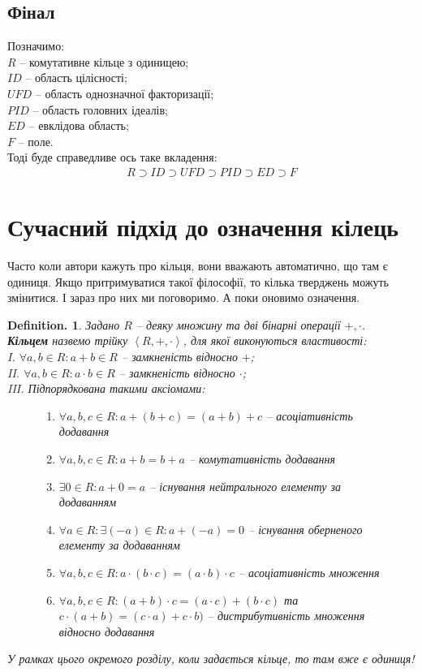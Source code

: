 \documentclass[a4paper, 10pt]{article}
\theoremstyle{theoremdd}
\theoremstyle{theoremdd}
\theoremstyle{theoremdd}
\newtheorem*{definition*}{Definition.}
\theoremstyle{theoremdd}
\theoremstyle{theoremdd}
\theoremstyle{theoremdd}
\theoremstyle{theoremdd}
\theoremstyle{theoremdd}
\theoremstyle{theoremdd}
\theoremstyle{theoremdd}
\theoremstyle{theoremdd}
\theoremstyle{theoremdd}
\theoremstyle{theoremdd}
\theoremstyle{theoremdd}
\theoremstyle{theoremdd}
\begin{document}
\subsection*{Фінал}
Позначимо: \\
$R$ -- комутативне кільце з одиницею; \\
$ID$ -- область цілісності; \\
$UFD$ -- область однозначної факторизації; \\
$PID$ -- область головних ідеалів; \\
$ED$ -- евклідова область; \\
$F$ -- поле.\\
Тоді буде справедливе ось таке вкладення:
\begin{align*}
R \supset ID \supset UFD \supset PID \supset ED \supset F
\end{align*}
\newpage
\section*{Сучасний підхід до означення кілець}
Часто коли автори кажуть про кільця, вони вважають автоматично, що там є одиниця. Якщо притримуватися такої філософії, то кілька тверджень можуть змінитися. І зараз про них ми поговоримо. А поки оновимо означення.

\begin{definition*}
Задано $R$ -- деяку множину та дві бінарні операції $+,\cdot$.\\
\textbf{Кільцем} назвемо трійку $\left<R, +, \cdot \right>$, для якої виконуються властивості:\\
I. $\forall a,b \in R: a+b \in R$ -- замкненість відносно $+$;\\
II. $\forall a,b \in R: a \cdot b \in R$ -- замкненість відносно $\cdot$;\\
III. Підпорядкована такими аксіомами:
\begin{figure}[H]
\centering
\begin{enumerate}[wide = 0pt, nosep, label={\arabic*)}]
\item $\forall a,b,c \in R: a+(b+c) = (a+b)+c$ -- асоціативність додавання
\item $\forall a,b,c \in R: a+b = b+a$ -- комутативність додавання
\item $\exists 0 \in R: a+0 = a$ -- існування нейтрального елементу за додаванням
\item $\forall a \in R: \exists (-a) \in R: a+(-a) = 0$ -- існування оберненого елементу за додаванням
\item $\forall a,b,c \in R: a \cdot (b \cdot c) = (a \cdot b) \cdot c$ -- асоціативність множення
\item $\forall a,b,c \in R: (a+b)\cdot c = (a\cdot c) + (b \cdot c)$ та $c \cdot (a+b) = (c \cdot a) + c \cdot b)$ -- дистрибутивність множення відносно додавання
\color{red}{\item $\exists 1 \in R: a \cdot 1 = 1 \cdot a = a$}
\end{enumerate}
\end{figure}
У рамках цього окремого розділу, коли задається кільце, то там вже є одиниця!
\end{definition*}
\end{document}
